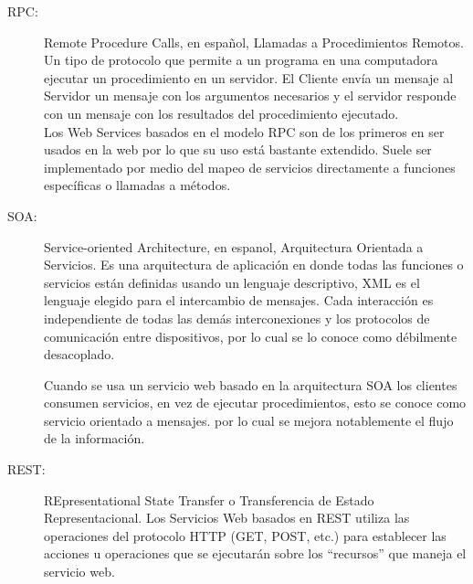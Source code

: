 \begin{description}
  \item[RPC:] Remote Procedure Calls, en español, Llamadas a Procedimientos Remotos. Un tipo de protocolo que permite a un programa en una computadora ejecutar un procedimiento en un servidor. El Cliente envía un mensaje al Servidor un mensaje con los argumentos necesarios y el servidor responde con un mensaje con los resultados del procedimiento ejecutado.\\

  Los Web Services basados en el modelo RPC son de los primeros en ser usados en la web por lo que su uso está bastante extendido. Suele ser implementado por medio del mapeo de servicios directamente a funciones específicas o llamadas a métodos.


  \item[SOA:] Service-oriented Architecture, en espanol, Arquitectura Orientada a Servicios.
Es una arquitectura de aplicación en donde todas las funciones o servicios están definidas usando un lenguaje descriptivo, XML es el lenguaje elegido para el intercambio de mensajes. Cada interacción es independiente de todas las demás interconexiones y los protocolos de comunicación entre dispositivos, por lo cual se lo conoce como débilmente desacoplado.

Cuando se usa un servicio web basado en la arquitectura SOA los clientes consumen servicios, en vez de ejecutar procedimientos, esto se conoce como servicio orientado a mensajes. por lo cual se mejora notablemente el flujo de la información.


  \item[REST:] REpresentational State Transfer o Transferencia de Estado Representacional.
  Los Servicios Web basados en REST utiliza las operaciones del protocolo HTTP (GET, POST, etc.) para establecer las acciones u operaciones que se ejecutarán sobre los ``recursos'' que maneja el servicio web.

\end{description}

